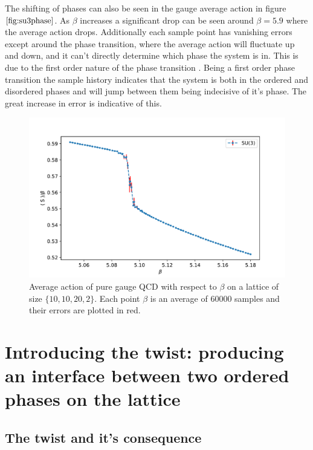 \documentclass[english,twoside,openright]{UH_TCM_MSc}
\begin{document}
The shifting of phases can also be seen in the gauge average action in figure $\ref{fig:su3phase}$. As $\beta$ increases a significant drop can be seen around $\beta = 5.9$ where the average action drops. Additionally each sample point has vanishing errors except around the phase transition, where the average action will fluctuate up and down, and it can't directly determine which phase the system is in. This is due to the first order nature of the phase transition \cite{Brown-first-order,FUKUGITA1990181}. Being a first order phase transition the sample history indicates that the system is both in the ordered and disordered phases and will jump between them being indecisive of it's phase. The great increase in error is indicative of this. 

\begin{figure}[htpb]
    \centering
    \includegraphics[width=\textwidth]{final_plots/misc/su3_phase_transition.pdf}
    \caption{Average action of pure gauge QCD with respect to $\beta$ on a lattice of size $\{10,10,20,2\}$. Each point $\beta$ is an average of 60000 samples and their errors are plotted in red.}
    \label{fig:su3phase}
\end{figure}

\chapter{Introducing the twist: producing an interface between two ordered phases on the lattice}


\section{The twist and it's consequence} \label{ch:twist_explanation}
\end{document}
